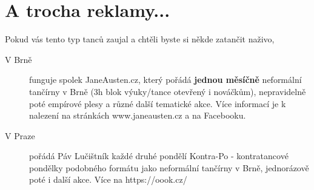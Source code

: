 {    \section*{A trocha reklamy...}

    Pokud vás tento typ tanců zaujal a chtěli byste si někde zatančit naživo,
    \begin{description}
        \item[V Brně] funguje spolek JaneAusten.cz, který pořádá \textbf{jednou měsíčně} neformální tančírny v Brně (3h blok výuky/tance otevřený i nováčkům), nepravidelně poté empírové plesy a různé další tematické akce. Více informací je k nalezení na stránkách www.janeausten.cz a na Facebooku.
        \item[V Praze] pořádá Páv Lučištník každé druhé pondělí Kontra-Po - kontratancové pondělky podobného formátu jako neformální tančírny v Brně, jednorázově poté i další akce. Více na https://oook.cz/
    \end{description}

    \cleardoublepage   %
}

